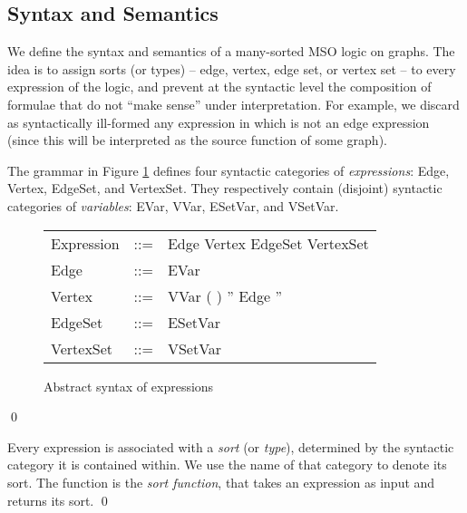 \documentclass{llncs}
\begin{document}
	\subsection{Syntax and Semantics}
	
	We define the syntax and semantics of a many-sorted MSO logic on graphs. The idea is to assign sorts (or types) -- edge, vertex, edge set, or vertex set -- to every expression of the logic, and prevent at the syntactic level the composition of formulae that do not ``make sense'' under interpretation. For example, we discard as syntactically ill-formed any expression  in which  is not an edge expression (since this will be interpreted as the source function of some graph).

	\begin{definition}[Expressions]\label{defn:ms_logic:expressions}\rm
		The grammar in Figure \ref{fig:app:expressions} defines four syntactic categories of \emph{expressions}: Edge, Vertex, EdgeSet, and VertexSet. They respectively contain (disjoint) syntactic categories of \emph{variables}: EVar, VVar, ESetVar, and VSetVar.

	\vspace*{-.25\baselineskip} \begin{figure}[htb]
	\renewcommand{\arraystretch}{1.2}
	\begin{center}
	\begin{tabular}{lcl}
	Expression & ::= & Edge  Vertex  EdgeSet  VertexSet \\
	Edge & ::= & EVar \\
	Vertex & ::= & VVar  (  ) '' Edge ''\\
	EdgeSet & ::= & ESetVar \\
	VertexSet & ::= & VSetVar \\
	\end{tabular}
	\end{center}
	\caption{Abstract syntax of expressions \label{fig:app:expressions}}
	\end{figure}
	\qed
	\end{definition}
	
	
	
	
	
	\begin{definition}\label{defn:app:sorts}\rm
		Every expression is associated with a \emph{sort} (or \emph{type}), determined by the syntactic category it is contained within. We use the name of that category to denote its sort. The function  is the \emph{sort function}, that takes an expression  as input and returns its sort.
	\qed
	\end{definition}
	
\end{document}
